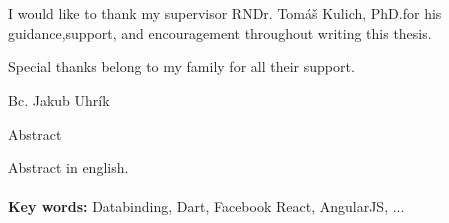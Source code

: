 \documentclass[oneside, 12pt]{book}
\def\mfkeywordsen{Databinding, Dart, Facebook React, AngularJS, ... }      %
\def\mfauthor{Bc. Jakub Uhrík}                            %
\def\mfadvisor{RNDr. Tomáš Kulich, PhD.}                                  %
\begin{document}
{~}\vspace{12cm}

\noindent
\begin{minipage}{0.25\textwidth}~\end{minipage}
\begin{center}
\begin{minipage}{1\textwidth}

I would like to thank my supervisor \mfadvisor for his guidance,support, and encouragement throughout writing this thesis. 

Special thanks belong to my family for all their support.

\end{minipage}
\end{center}
\hfill\mfauthor
\vfill\eject 



%


\noindent
\begin{center}
\begin{minipage}{1\textwidth}
\centerline{\large Abstract}
Abstract in english.
\\ \\ 
{\bf Key words:} \mfkeywordsen
\end{minipage}
\end{center}
\eject %
\end{document}
